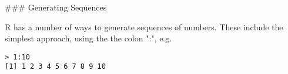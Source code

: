 
### Generating Sequences 

R has a number of ways to generate sequences of numbers. 
These include the simplest approach, using the the colon ":", e.g.


\begin{framed}
\begin{verbatim}
> 1:10
[1] 1 2 3 4 5 6 7 8 9 10
\end{verbatim}
\end{framed}
